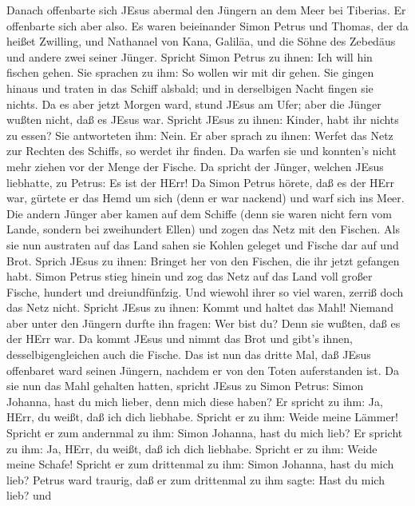  Danach offenbarte sich JEsus abermal den Jüngern an dem
Meer bei Tiberias. Er offenbarte sich aber also.  Es waren
beieinander Simon Petrus und Thomas, der da heißet Zwilling, und
Nathanael von Kana, Galiläa, und die Söhne des Zebedäus und andere zwei
seiner Jünger.  Spricht Simon Petrus zu ihnen: Ich will hin
fischen gehen. Sie sprachen zu ihm: So wollen wir mit dir gehen. Sie
gingen hinaus und traten in das Schiff alsbald; und in derselbigen Nacht
fingen sie nichts.  Da es aber jetzt Morgen ward, stund
JEsus am Ufer; aber die Jünger wußten nicht, daß es JEsus war.
 Spricht JEsus zu ihnen: Kinder, habt ihr nichts zu essen?
Sie antworteten ihm: Nein.  Er aber sprach zu ihnen: Werfet
das Netz zur Rechten des Schiffs, so werdet ihr finden. Da warfen sie
und konnten's nicht mehr ziehen vor der Menge der Fische. 
Da spricht der Jünger, welchen JEsus liebhatte, zu Petrus: Es ist der
HErr! Da Simon Petrus hörete, daß es der HErr war, gürtete er das Hemd
um sich (denn er war nackend) und warf sich ins Meer.  Die
andern Jünger aber kamen auf dem Schiffe (denn sie waren nicht fern vom
Lande, sondern bei zweihundert Ellen) und zogen das Netz mit den
Fischen.  Als sie nun austraten auf das Land sahen sie
Kohlen geleget und Fische dar auf und Brot.  Sprich JEsus
zu ihnen: Bringet her von den Fischen, die ihr jetzt gefangen habt.
 Simon Petrus stieg hinein und zog das Netz auf das Land
voll großer Fische, hundert und dreiundfünfzig. Und wiewohl ihrer so
viel waren, zerriß doch das Netz nicht.  Spricht JEsus zu
ihnen: Kommt und haltet das Mahl! Niemand aber unter den Jüngern durfte
ihn fragen: Wer bist du? Denn sie wußten, daß es der HErr war.
 Da kommt JEsus und nimmt das Brot und gibt's ihnen,
desselbigengleichen auch die Fische.  Das ist nun das
dritte Mal, daß JEsus offenbaret ward seinen Jüngern, nachdem er von den
Toten auferstanden ist.  Da sie nun das Mahl gehalten
hatten, spricht JEsus zu Simon Petrus: Simon Johanna, hast du mich
lieber, denn mich diese haben? Er spricht zu ihm: Ja, HErr, du weißt,
daß ich dich liebhabe. Spricht er zu ihm: Weide meine Lämmer!
 Spricht er zum andernmal zu ihm: Simon Johanna, hast du
mich lieb? Er spricht zu ihm: Ja, HErr, du weißt, daß ich dich liebhabe.
Spricht er zu ihm: Weide meine Schafe!  Spricht er zum
drittenmal zu ihm: Simon Johanna, hast du mich lieb? Petrus ward
traurig, daß er zum drittenmal zu ihm sagte: Hast du mich lieb? und
